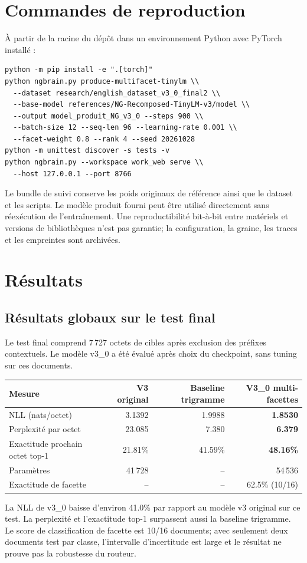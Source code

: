 \documentclass[11pt,a4paper]{article}
\begin{document}
\section{Commandes de reproduction}
À partir de la racine du dépôt dans un environnement Python avec PyTorch installé :
\begin{lstlisting}
python -m pip install -e ".[torch]"
python ngbrain.py produce-multifacet-tinylm \\
  --dataset research/english_dataset_v3_0_final2 \\
  --base-model references/NG-Recomposed-TinyLM-v3/model \\
  --output model_produit_NG_v3_0 --steps 900 \\
  --batch-size 12 --seq-len 96 --learning-rate 0.001 \\
  --facet-weight 0.8 --rank 4 --seed 20261028
python -m unittest discover -s tests -v
python ngbrain.py --workspace work_web serve \\
  --host 127.0.0.1 --port 8766
\end{lstlisting}
Le bundle de suivi conserve les poids originaux de référence ainsi que le dataset et les scripts. Le modèle produit fourni peut être utilisé directement sans réexécution de l'entraînement. Une reproductibilité bit-à-bit entre matériels et versions de bibliothèques n'est pas garantie; la configuration, la graine, les traces et les empreintes sont archivées.

\section{Résultats}
\subsection{Résultats globaux sur le test final}
Le test final comprend 7\,727 octets de cibles après exclusion des préfixes contextuels. Le modèle v3\_0 a été évalué après choix du checkpoint, sans tuning sur ces documents.

\begin{center}
\begin{tabular}{lrrr}
\toprule
Mesure & V3 original & Baseline trigramme & V3\_0 multi-facettes\\
\midrule
NLL (nats/octet) & 3.1392 & 1.9988 & \textbf{1.8530}\\
Perplexité par octet & 23.085 & 7.380 & \textbf{6.379}\\
Exactitude prochain octet top-1 & 21.81\% & 41.59\% & \textbf{48.16\%}\\
Paramètres & 41\,728 & -- & 54\,536\\
Exactitude de facette & -- & -- & 62.5\% (10/16)\\
\bottomrule
\end{tabular}
\end{center}
La NLL de v3\_0 baisse d'environ 41.0\% par rapport au modèle v3 original sur ce test. La perplexité et l'exactitude top-1 surpassent aussi la baseline trigramme. Le score de classification de facette est 10/16 documents; avec seulement deux documents test par classe, l'intervalle d'incertitude est large et le résultat ne prouve pas la robustesse du routeur.
\end{document}
